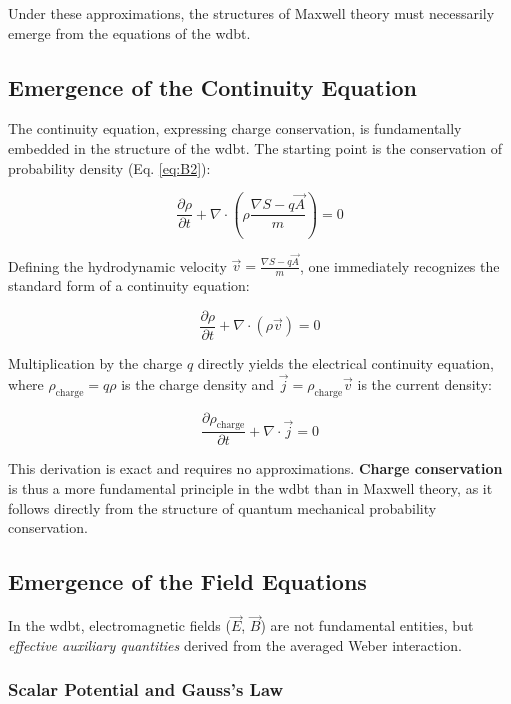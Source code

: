 Under these approximations, the structures of Maxwell theory must necessarily emerge from the equations of the \gls{wdbt}.

\subsection{Emergence of the Continuity Equation}

The continuity equation, expressing charge conservation, is fundamentally embedded in the structure of the \gls{wdbt}. The starting point is the conservation of probability density (Eq. \ref{eq:B2}):

\begin{equation}
    \frac{\partial \rho}{\partial t} + \nabla \cdot \left( \rho \frac{\nabla S - q\vec{A}}{m} \right) = 0
\end{equation}

Defining the hydrodynamic velocity $\vec{v} = \frac{\nabla S - q\vec{A}}{m}$, one immediately recognizes the standard form of a continuity equation:

\begin{equation}
    \frac{\partial \rho}{\partial t} + \nabla \cdot (\rho \vec{v}) = 0
\end{equation}

Multiplication by the charge $q$ directly yields the electrical continuity equation, where $\rho_{\text{charge}} = q\rho$ is the charge density and $\vec{j} = \rho_{\text{charge}} \vec{v}$ is the current density:

\begin{equation}
    \frac{\partial \rho_{\text{charge}}}{\partial t} + \nabla \cdot \vec{j} = 0
\end{equation}

This derivation is exact and requires no approximations. \textbf{Charge conservation} is thus a more fundamental principle in the \gls{wdbt} than in Maxwell theory, as it follows directly from the structure of quantum mechanical probability conservation.

\subsection{Emergence of the Field Equations}

In the \gls{wdbt}, electromagnetic fields ($\vec{E}$, $\vec{B}$) are not fundamental entities, but \textit{effective auxiliary quantities} derived from the averaged Weber interaction.

\subsubsection{Scalar Potential and Gauss's Law}

